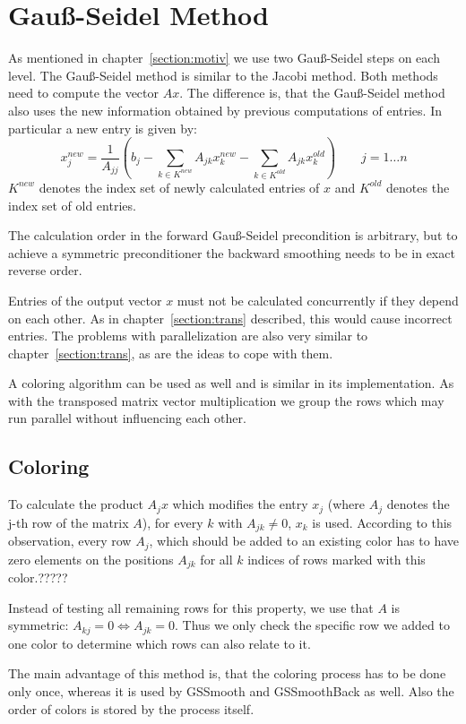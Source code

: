 \documentclass[a4paper,11pt]{scrartcl}
\begin{document}
\section{Gauß-Seidel Method}
As mentioned in chapter~\ref{section:motiv} we use two Gauß-Seidel steps on
each level. The Gauß-Seidel method is similar to the Jacobi method.
Both methods need to compute the vector $Ax$. The difference is, that the
Gauß-Seidel method also uses the new information obtained by previous
computations of entries.
In particular a new entry is given by:
$$ x_j^{new} = \frac{1}{A_{jj}} \left(b_{j} - \sum_{k \in K^{new}}A_{jk}
x_k^{new} - \sum_{k \in K^{old}}A_{jk} x_k^{old}\right) \qquad j = 1 \dots n$$
$K^{new}$ denotes the index set of newly calculated entries
of $x$ and $K^{old}$ denotes the index set of old entries.
\cite{numerik} \cite{numpde}

The calculation order in the forward Gauß-Seidel precondition is arbitrary,
but to achieve a symmetric preconditioner the backward smoothing needs to be
in exact reverse order.

Entries of the output vector $x$ must not be calculated concurrently if they
depend on each other. As in chapter~\ref{section:trans} described, this would
cause incorrect entries. The problems with parallelization are also very
similar to chapter~\ref{section:trans}, as are the ideas to cope with them.

A coloring algorithm can be used as well and is similar in its implementation.
As with the transposed matrix vector multiplication we group the rows which
may run parallel without influencing each other.

\subsection{Coloring}
To calculate the product $A_jx$ which modifies the entry $x_j$ (where $A_j$
denotes the j-th row of the matrix $A$), for every $k$ with $A_{jk} \neq 0$,
$x_k$ is used. According to this observation, every row $A_j$, which should be
added to an existing color has to have zero elements on the positions $A_{jk}$
for all $k$ indices of rows marked with this color.?????

Instead of testing all remaining rows for this property, we use that $A$ is
symmetric: $A_{kj} = 0 \Leftrightarrow A_{jk} = 0$. Thus we only check
the specific row we added to one color to determine which rows can also
relate to it.

The main advantage of this method is, that the coloring process has to be
done only once, whereas it is used by GSSmooth and GSSmoothBack as well.
Also the order of colors is stored by the process itself.
\end{document}

